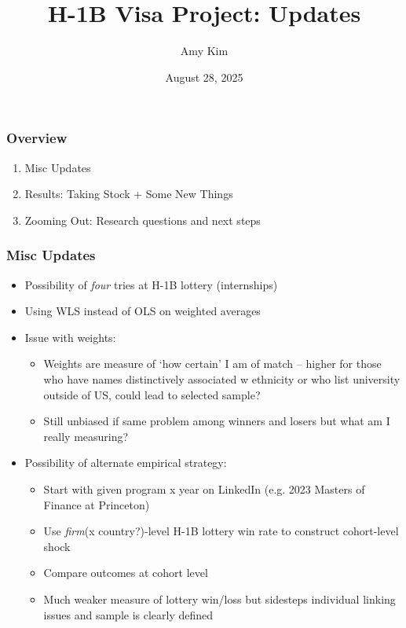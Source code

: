 \documentclass[xcolor=dvipsnames, compress, 12pt, aspectratio=169, handout]{beamer}
\title{H-1B Visa Project: Updates}
\author{Amy Kim}
\date{August 28, 2025}
\begin{document}
\begin{frame}[plain]
    \titlepage
    \addtocounter{framenumber}{-1}
\end{frame}

\begin{frame}
    \frametitle{Overview}
    \begin{enumerate}
        \item Misc Updates
        \item Results: Taking Stock + Some New Things
        \item Zooming Out: Research questions and next steps
    \end{enumerate}
\end{frame}

\begin{frame}
    \frametitle{Misc Updates}
    \begin{itemize}
        \item Possibility of \textit{four} tries at H-1B lottery (internships)
        \item Using WLS instead of OLS on weighted averages
        \item Issue with weights:
        \begin{itemize}
            \item Weights are measure of `how certain' I am of match -- higher for those who have names distinctively associated w ethnicity or who list university outside of US, could lead to selected sample? 
            \item Still unbiased if same problem among winners and losers but what am I really measuring?
        \end{itemize}
        \item Possibility of alternate empirical strategy: 
        \begin{itemize}
            \item Start with given program x year on LinkedIn (e.g. 2023 Masters of Finance at Princeton) 
            \item Use \textit{firm}(x country?)-level H-1B lottery win rate to construct cohort-level shock
            \item Compare outcomes at cohort level
            \item Much weaker measure of lottery win/loss but sidesteps individual linking issues and sample is clearly defined
        \end{itemize}
    \end{itemize}
\end{frame}
\end{document}
